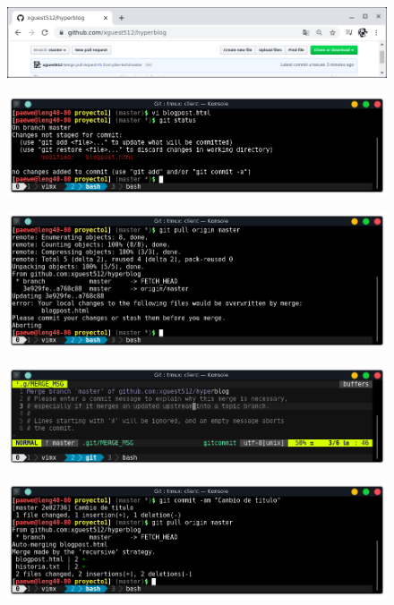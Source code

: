 \documentclass{article}
\begin{document}
\begin{figure}[h!]
  \centering
  \includegraphics[scale=0.75]{./Pictures/237_pull_request_log.png}
\end{figure}

\begin{figure}[h!]
  \centering
  \includegraphics[scale=0.75]{./Pictures/238_cambio_sin_pull.png}
\end{figure}

\begin{figure}[h!]
  \centering
  \includegraphics[scale=0.75]{./Pictures/239_error.png}
\end{figure}

\begin{figure}[h!]
  \centering
  \includegraphics[scale=0.75]{./Pictures/240_merge_message.png}
\end{figure}

\begin{figure}[h!]
  \centering
  \includegraphics[scale=0.75]{./Pictures/241_commit_pull.png}
\end{figure}
\end{document}
